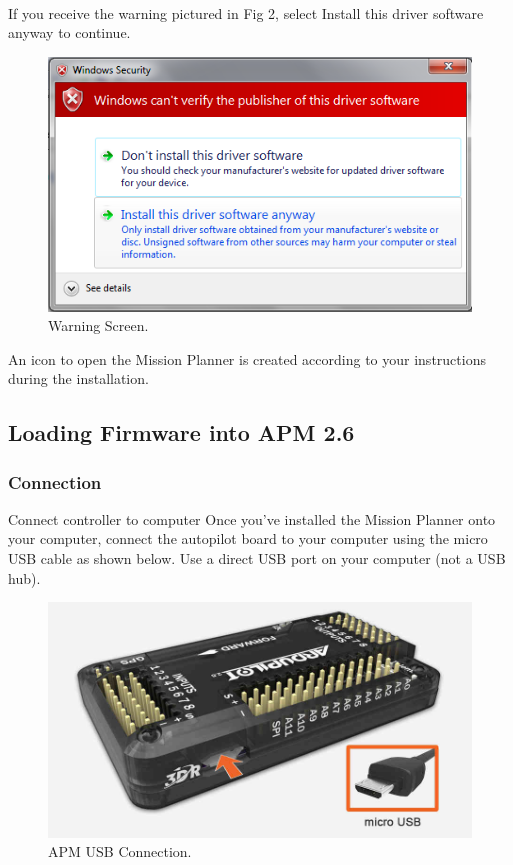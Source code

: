 \documentclass[11pt,a4paper]{article}
\begin{document}
	 \paragraph{}If you receive the warning pictured in Fig 2, select Install this driver software anyway to continue.
	 \begin{figure}[H]
	 	\centering
		\includegraphics[scale=0.75]{driver}
	 	\caption{Warning Screen.}
\end{figure}

An icon to open the Mission Planner is created according to your instructions during the installation.

	\subsection{Loading Firmware into APM 2.6}
		\subsubsection{Connection}Connect controller to computer
Once you’ve installed the Mission Planner onto your computer, connect the autopilot board to your computer using the micro USB cable as shown below. Use a direct USB port on your computer (not a USB hub).
		\begin{figure}[H]
	 	\centering
		\includegraphics[scale=0.20]{usb}
	 	\caption{APM USB Connection.}
		\end{figure}
		
\end{document}
